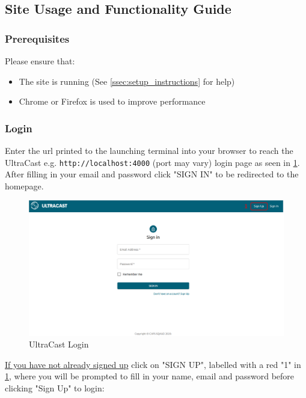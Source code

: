 \documentclass[../report.tex]{subfiles}
\begin{document}
\newpage

\subsection{Site Usage and Functionality Guide}

\subsubsection{Prerequisites}

Please ensure that:
\begin{itemize}
    \item The site is running (See \cref{ssec:setup_instructions} for help)
    \item Chrome or Firefox is used to improve performance
\end{itemize}

\subsubsection{Login}

Enter the url printed to the launching terminal into your browser to reach the UltraCast e.g. \verb|http://localhost:4000|
(port may vary)
login page as seen in \cref{fig:UM_Login}. After filling in your email and password 
click "SIGN IN" to be redirected to the homepage.
%
\begin{figure}[ht] 
    \centering
    \includegraphics[width=16cm]{resources/UM_Login}
    \caption{UltraCast Login}
    \label{fig:UM_Login} 
\end{figure}

\underline{If you have not already signed up} click on "SIGN UP", labelled with a red "1" in \cref{fig:UM_Login}, where
you will be prompted to fill in your name, email and password before clicking "Sign Up" to login:
\end{document}
